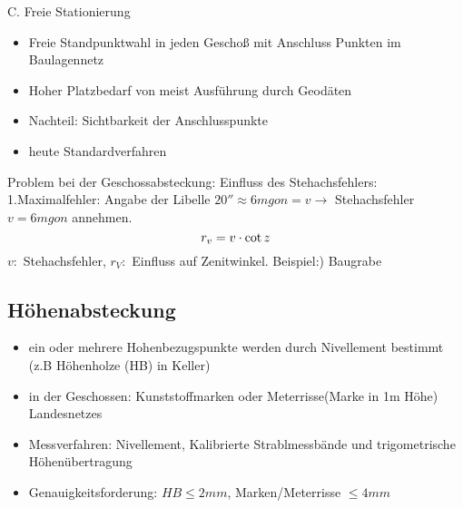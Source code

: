\documentclass[12pt]{article}
\begin{document}
C. Freie Stationierung
\begin{itemize}
\item Freie Standpunktwahl in jeden Geschoß mit Anschluss Punkten im Baulagennetz
\item Hoher Platzbedarf von meist Ausführung durch Geodäten
\item Nachteil: Sichtbarkeit der Anschlusspunkte
\item heute Standardverfahren
\end{itemize}
Problem bei der Geschossabsteckung:
Einfluss des Stehachsfehlers: 1.Maximalfehler: Angabe der Libelle $20'' \approx 6mgon = v \longrightarrow$ Stehachsfehler $v=6mgon$ annehmen. \newline
\begin{equation*}
r_v = v \cdot \cot z \\
\end{equation*}
$v:$ Stehachsfehler, $r_V:$ Einfluss auf Zenitwinkel. \newline
Beispiel:) Baugrabe
\begin{figure*}[ht]\centering
\end{figure*}
\newline
\begin{figure*}[ht]\centering
\end{figure*}
\subsection{Höhenabsteckung}
\begin{itemize}
\item ein oder mehrere Hohenbezugspunkte werden durch Nivellement bestimmt (z.B Höhenholze (HB) in Keller)
\item in der Geschossen: Kunststoffmarken oder Meterrisse(Marke in 1m Höhe) Landesnetzes
\item Messverfahren: Nivellement, Kalibrierte Strablmessbände und trigometrische Höhenübertragung
\item Genauigkeitsforderung: $HB \leq 2mm$, Marken/Meterrisse $\leq 4mm$ 
\end{itemize}
\end{document}
